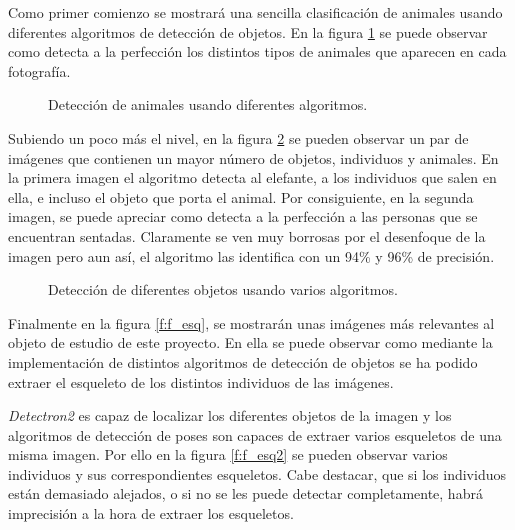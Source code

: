 Como primer comienzo se mostrará una sencilla clasificación de animales usando diferentes algoritmos de detección de objetos. En la figura \ref{f:animales1} se puede observar como detecta a la perfección los distintos tipos de animales que aparecen en cada fotografía. 

\begin{figure}[H]
 \centering
 \caption{Detección de animales usando diferentes algoritmos.}
 \label{f:animales1}
\end{figure}

Subiendo un poco más el nivel, en la figura \ref{f:animales2} se pueden observar un par de imágenes que contienen un mayor número de objetos, individuos y animales. En la primera imagen el algoritmo detecta al elefante, a los individuos que salen en ella, e incluso el objeto que porta el animal. Por consiguiente, en la segunda imagen, se puede apreciar como detecta a la perfección a las personas que se encuentran sentadas. Claramente se ven muy borrosas por el desenfoque de la imagen pero aun así, el algoritmo las identifica con un 94\% y 96\% de precisión. 

\begin{figure}[H]
 \centering
 \caption{Detección de diferentes objetos usando varios algoritmos.}
 \label{f:animales2}
\end{figure}

Finalmente en la figura \ref{f:f_esq}, se mostrarán unas imágenes más relevantes al objeto de estudio de este proyecto. En ella se puede observar como mediante la implementación de distintos algoritmos de detección de objetos se ha podido extraer el esqueleto de los distintos individuos de las imágenes. 

\textit{Detectron2} es capaz de localizar los diferentes objetos de la imagen y los algoritmos de detección de poses son capaces de extraer varios esqueletos de una misma imagen. Por ello en la figura \ref{f:f_esq2} se pueden observar varios individuos y sus correspondientes esqueletos. Cabe destacar, que si los individuos están demasiado alejados, o si no se les puede detectar completamente, habrá imprecisión a la hora de extraer los esqueletos. 

